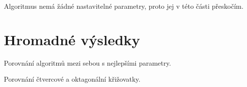 Algoritmus  nemá žádné nastavitelné parametry, proto jej v této části přeskočím.

%





\section{Hromadné výsledky}\label{sec:hromadne_vysledky}

Porovnání algoritmů mezi sebou s nejlepšími parametry.

Porovnání čtvercové a oktagonální křižovatky.



